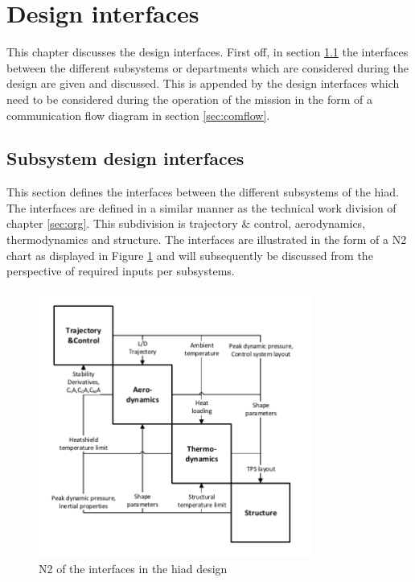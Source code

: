 \section{Design interfaces} \label{ch:di}

This chapter discusses the design interfaces. First off, in section \ref{sec:N2} the interfaces between the different subsystems or departments which are considered during the design are given and discussed. This is appended by the design interfaces which need to be considered during the operation of the mission in the form of a communication flow diagram in section \ref{sec:comflow}.

\subsection{Subsystem design interfaces} \label{sec:N2}
This section defines the interfaces between the different subsystems of the \gls{hiad}. The interfaces are defined in a similar manner as the technical work division of chapter \ref{sec:org}. This subdivision is trajectory \& control, aerodynamics, thermodynamics and structure. The interfaces are illustrated in the form of a N2 chart as displayed in Figure  \ref{fig:N2} and will subsequently be discussed from the perspective of required inputs per subsystems.

\begin{figure}[H]
\centering
\includegraphics[width = 0.8\textwidth]{Figure/N2.pdf}
\caption{N2 of the interfaces in the \gls{hiad} design}
\label{fig:N2}
\end{figure}

